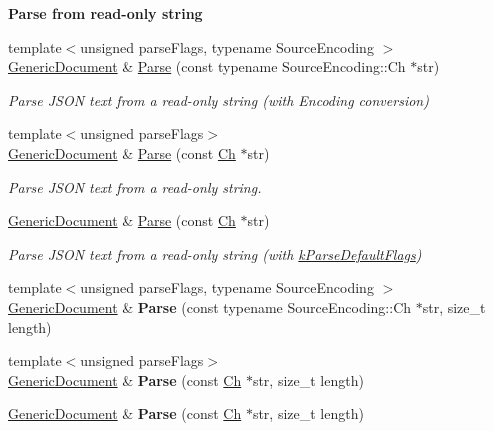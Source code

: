\begin{Indent}\textbf{ Parse from read-\/only string}\par
\begin{DoxyCompactItemize}
\item 
{\footnotesize template$<$unsigned parse\+Flags, typename Source\+Encoding $>$ }\\\hyperlink{a01996}{Generic\+Document} \& \hyperlink{a01996_aadee36db7064cc9894a75c848831cdae}{Parse} (const typename Source\+Encoding\+::\+Ch $\ast$str)
\begin{DoxyCompactList}\small\item\em Parse J\+S\+ON text from a read-\/only string (with Encoding conversion) \end{DoxyCompactList}\item 
{\footnotesize template$<$unsigned parse\+Flags$>$ }\\\hyperlink{a01996}{Generic\+Document} \& \hyperlink{a01996_a5e377f840009b5cee6757be29525ce0b}{Parse} (const \hyperlink{a01992_ade0e0ce64ccd5d852da57a35e720bafb}{Ch} $\ast$str)
\begin{DoxyCompactList}\small\item\em Parse J\+S\+ON text from a read-\/only string. \end{DoxyCompactList}\item 
\hyperlink{a01996}{Generic\+Document} \& \hyperlink{a01996_a49ae6de6fd0bc820d9864a106c10b4da}{Parse} (const \hyperlink{a01992_ade0e0ce64ccd5d852da57a35e720bafb}{Ch} $\ast$str)
\begin{DoxyCompactList}\small\item\em Parse J\+S\+ON text from a read-\/only string (with \hyperlink{a00563_ab7be7dabe6ffcba60fad441505583450a9104b0946d648e9467cb7a967401ec80}{k\+Parse\+Default\+Flags}) \end{DoxyCompactList}\item 
\mbox{\label{a01996_a46b5028cc760c4e915a0d5216af9f7e2}} 
{\footnotesize template$<$unsigned parse\+Flags, typename Source\+Encoding $>$ }\\\hyperlink{a01996}{Generic\+Document} \& {\bfseries Parse} (const typename Source\+Encoding\+::\+Ch $\ast$str, size\+\_\+t length)
\item 
\mbox{\label{a01996_a93fec16eacec4f4b42075bb3bc242a6b}} 
{\footnotesize template$<$unsigned parse\+Flags$>$ }\\\hyperlink{a01996}{Generic\+Document} \& {\bfseries Parse} (const \hyperlink{a01992_ade0e0ce64ccd5d852da57a35e720bafb}{Ch} $\ast$str, size\+\_\+t length)
\item 
\mbox{\label{a01996_ab13d8358acc0648e3f91f6b825365e4f}} 
\hyperlink{a01996}{Generic\+Document} \& {\bfseries Parse} (const \hyperlink{a01992_ade0e0ce64ccd5d852da57a35e720bafb}{Ch} $\ast$str, size\+\_\+t length)
\end{DoxyCompactItemize}
\end{Indent}
